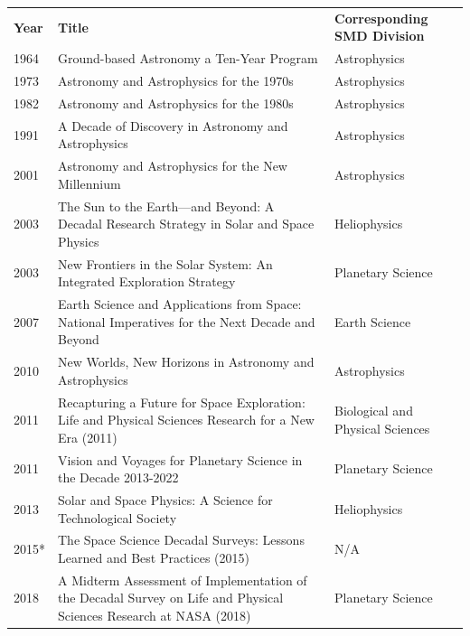 \documentclass[preprint,12pt]{elsarticle}
\begin{document}
\begin{table}[H]
\centering
\begin{tabular}{p{1.2cm} p{8.5cm} p{2.9cm}}
 \hline
 \rowcolor[gray]{0.95}
 \textbf{Year} & \textbf{Title} & \textbf{Corresponding SMD Division} \\

 1964 & Ground-based Astronomy a Ten-Year Program & Astrophysics \\

 1973 & Astronomy and Astrophysics for the 1970s & Astrophysics \\

 1982 & Astronomy and Astrophysics for the 1980s & Astrophysics \\

 1991 & A Decade of Discovery in Astronomy and Astrophysics & Astrophysics \\

 2001 & Astronomy and Astrophysics for the New Millennium & Astrophysics \\

 2003 & The Sun to the Earth—and Beyond: A Decadal Research Strategy in Solar and Space Physics & Heliophysics \\

 2003 & New Frontiers in the Solar System: An Integrated Exploration Strategy & Planetary Science \\

 2007 & Earth Science and Applications from Space: National Imperatives for the Next Decade and Beyond & Earth Science \\

 2010 & New Worlds, New Horizons in Astronomy and Astrophysics & Astrophysics \\

 2011 & Recapturing a Future for Space Exploration: Life and Physical Sciences Research for a New Era (2011) & Biological and Physical Sciences \\

 2011 & Vision and Voyages for Planetary Science in the Decade 2013-2022 & Planetary Science \\

 2013 & Solar and Space Physics: A Science for Technological Society & Heliophysics \\

 2015* & The Space Science Decadal Surveys: Lessons Learned and Best Practices (2015) & N/A \\

 2018 & A Midterm Assessment of Implementation of the Decadal Survey on Life and Physical Sciences Research at NASA (2018) & Planetary Science \\


\end{tabular}
\end{table}
\end{document}
